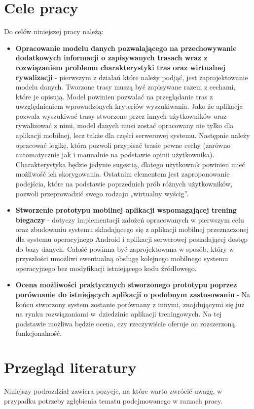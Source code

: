 \section{Cele pracy}\label{chap:cele-pracy}
Do celów niniejszej pracy należą:
\begin{itemize}
\item \textbf{Opracowanie modelu danych pozwalającego na przechowywanie dodatkowych informacji o zapisywanych trasach wraz z rozwiązaniem problemu charakterystyki tras oraz wirtualnej rywalizacji} - pierwszym z działań które należy podjąć, jest zaprojektowanie modelu danych. Tworzone trasy muszą być zapisywane razem z cechami, które je opisują. Model powinien pozwalać na przeglądanie tras z uwzględnieniem wprowadzonych kryteriów wyszukiwania. Jako że aplikacja pozwala wyszukiwać trasy stworzone przez innych użytkowników oraz rywalizować z nimi, model danych musi zostać opracowany nie tylko dla aplikacji mobilnej, lecz także dla części serwerowej systemu. Następnie należy opracować logikę, która pozwoli przypisać trasie pewne cechy (zarówno automatycznie jak i manualnie na podstawie opinii użytkownika). Charakterystyka będzie jedynie sugestią, dlatego użytkownik powinien mieć możliwość ich skorygowania. Ostatnim elementem jest zaproponowanie podejścia, które na podstawie poprzednich prób różnych użytkowników, pozwoli przeprowadzić swego rodzaju „wirtualny wyścig”.
\item \textbf{Stworzenie prototypu mobilnej aplikacji wspomagającej trening biegaczy} - dotyczy implementacji założeń opracowanych w pierwszym celu oraz zbudowaniu systemu składającego się z aplikacji mobilnej przeznaczonej dla systemu operacyjnego Android \cite{android} i aplikacji serwerowej posiadającej dostęp do bazy danych. Całość powinna być zaprojektowana w sposób, który w przyszłości umożliwi ewentualną obsługę kolejnego mobilnego systemu operacyjnego bez modyfikacji istniejącego kodu źródłowego.
\item \textbf{Ocena możliwości praktycznych stworzonego prototypu poprzez porównanie do istniejących aplikacji o podobnym zastosowaniu} - Na końcu stworzony system zostanie porównany z innymi, znajdującymi się już na rynku rozwiązaniami w~dziedzinie aplikacji treningowych. Na tej podstawie możliwa będzie ocena, czy rzeczywiście oferuje on rozszerzoną funkcjonalność.
\end{itemize}

\section{Przegląd literatury}
Niniejszy podrozdział zawiera pozycje, na które warto zwrócić uwagę, w przypadku potrzeby zgłębienia tematu podejmowanego w ramach pracy.
